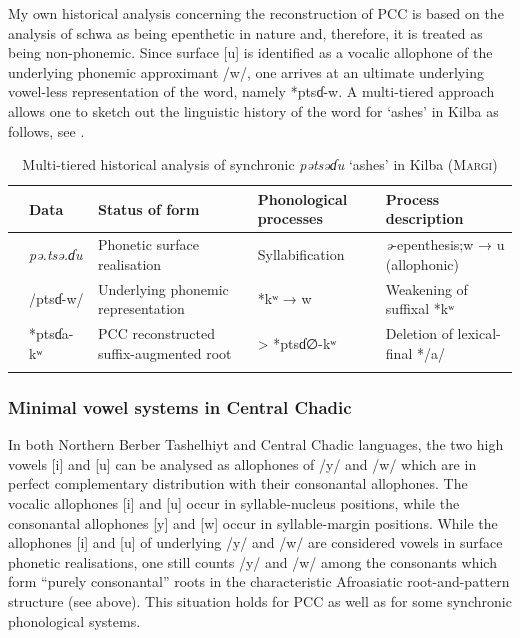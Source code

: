 \documentclass[output=paper]{langscibook}
\begin{document}
My own historical analysis concerning the reconstruction of PCC is based on the analysis of schwa as being epenthetic in nature and, therefore, it is treated as being non-phonemic. Since surface [u] is identified as a vocalic allophone of the underlying phonemic approximant /w/, one arrives at an ultimate underlying vowel-less representation of the word, namely *ptsɗ-w. A multi-tiered approach allows one to sketch out the linguistic history of the word for ‘ashes’ in Kilba as follows, see .

\begin{table}
\caption{Multi-tiered historical analysis of synchronic \textit{pətsəɗu} ‘ashes’ in Kilba (\textsc{Margi})}
\label{tab:wolff:3}
\begin{tabularx}{\textwidth}{llQQQ}
\lsptoprule
& Data & Status of form & Phonological processes & Process description\\
 \midrule
 & {\itshape pə.tsə.ɗu} & Phonetic surface realisation & Syllabification & \textit{ə}-epenthesis;\newline *w → u (allophonic)\\
\tablevspace
& /ptsɗ-w/ & Underlying phonemic representation & *kʷ → w & Weakening of suffixal *kʷ \\
\tablevspace
{}& *ptsɗa-kʷ & PCC reconstructed suffix-augmented root & > *ptsɗ∅-kʷ & Deletion of lexical-final */a/\\
\lspbottomrule
\end{tabularx}
\end{table}

\subsubsection{Minimal vowel systems in Central Chadic}
\label{sec:Wolff:1.4.4}
In both Northern Berber Tashelhiyt and Central Chadic languages, the two high vowels [i] and [u] can be analysed as allophones of /y/ and /w/ which are in perfect complementary distribution with their consonantal allophones. The vocalic allophones [i] and [u] occur in syllable-nucleus positions, while the consonantal allophones [y] and [w] occur in syllable-margin positions. While the allophones [i] and [u] of underlying /y/ and /w/ are considered vowels in surface phonetic realisations, one still counts /y/ and /w/ among the consonants which form ``purely consonantal'' roots in the characteristic Afroasiatic root-and-pattern structure (see  above). This situation holds for PCC as well as for some synchronic phonological systems.
\end{document}
